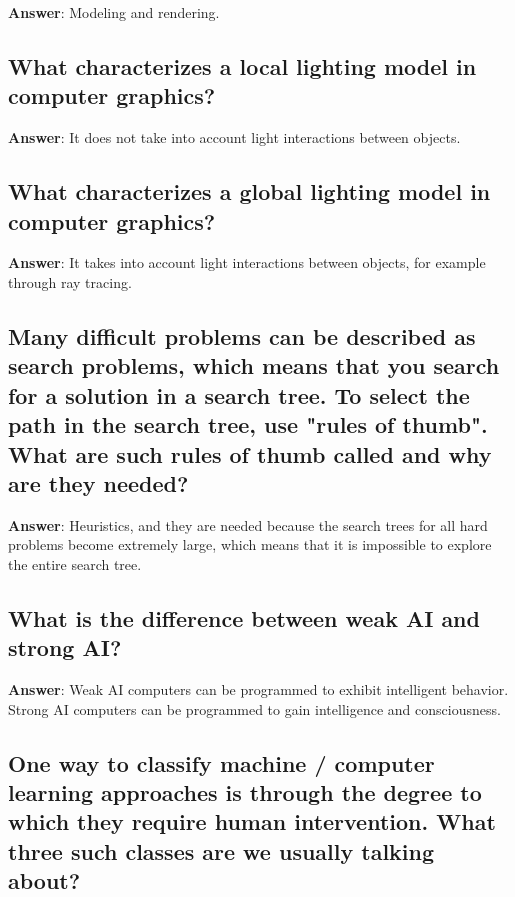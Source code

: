 \documentclass[a4paper,11pt,oneside]{article}
\begin{document}
\begin{sloppypar}
\textbf{Answer}: Modeling and rendering.



\subsection{What characterizes a local lighting model in computer graphics?}

\label{q:309:sa:en:True}

\textbf{Answer}: It does not take into account light interactions between objects.



\subsection{What characterizes a global lighting model in computer graphics?}

\label{q:310:sa:en:True}

\textbf{Answer}: It takes into account light interactions between objects, for example through ray tracing.



\subsection{Many difficult problems can be described as search problems, which means that you search for a solution in a search tree. To select the path in the search tree, use "rules of thumb". What are such rules of thumb called and why are they needed?}

\label{q:311:sa:en:True}

\textbf{Answer}: Heuristics, and they are needed because the search trees for all hard problems become extremely large, which means that it is impossible to explore the entire search tree.



\subsection{What is the difference between weak AI and strong AI?}

\label{q:312:sa:en:True}

\textbf{Answer}: Weak AI {\textendash} computers can be programmed to exhibit intelligent behavior. Strong AI {\textendash} computers can be programmed to gain intelligence and consciousness.



\subsection{One way to classify machine / computer learning approaches is through the degree to which they require human intervention. What three such classes are we usually talking about?}


\end{sloppypar}
\end{document}
